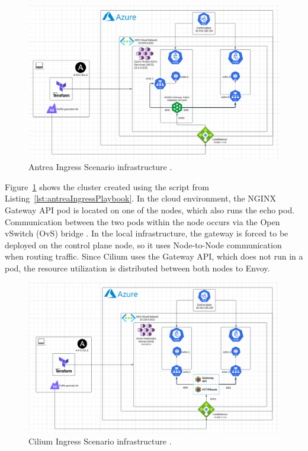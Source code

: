 \begin{figure}[tbh]
  \centering
  \includegraphics[width=1\columnwidth]{images/antrea_cloud_traffic_splitting.png}
  \caption{Antrea Ingress Scenario infrastructure \cite{K6}\cite{NGINX}.}
  \label{fig:antreaIngressScenarioArch}
\end{figure}

Figure~\ref{fig:antreaIngressScenarioArch} shows the cluster created using the script from Listing~\ref{lst:antreaIngressPlaybook}. In the cloud environment, the NGINX Gateway API pod is located on one of the nodes, which also runs the echo pod. Communication between the two pods within the node occurs via the Open vSwitch (OvS) bridge \cite{AntreaDocs}. In the local infrastructure, the gateway is forced to be deployed on the control plane node, so it uses Node-to-Node communication when routing traffic. Since Cilium uses the Gateway API, which does not run in a pod, the resource utilization is distributed between both nodes to Envoy.



\begin{figure}[H]
  \centering
  \includegraphics[width=1\columnwidth]{images/cilium_cloud_traffic_splitting.png}
  \caption{Cilium Ingress Scenario infrastructure \cite{CiliumDocs}\cite{CiliumUseCases}.}
  \label{fig:ciliumIngressScenarioArch}
\end{figure}

